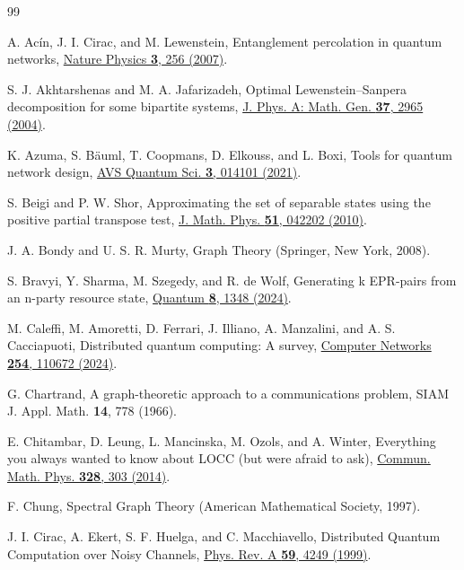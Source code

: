 \documentclass[a4paper,onecolumn,accepted=2024-12-14]{quantumarticle}
\theoremstyle{plain}
\begin{document}
\begin{thebibliography}{99}




 A. Ac\'in, J. I. Cirac, and M. Lewenstein, Entanglement percolation in quantum networks, \href{https://doi.org/10.1038/nphys549}{Nature Physics \textbf{3}, 256 (2007)}.

 S. J. Akhtarshenas and M. A. Jafarizadeh, Optimal Lewenstein–Sanpera decomposition for some bipartite
  systems, \href{https://doi.org/10.1088/0305-4470/37/8/008}{J. Phys. A: Math. Gen. \textbf{37}, 2965 (2004)}.
  
 K. Azuma, S. B{\"a}uml, T. Coopmans, D. Elkouss, and L. Boxi, Tools for quantum network design, \href{https://doi.org/10.1116/5.0024062}{AVS Quantum Sci. \textbf{3}, 014101 (2021)}.

 S. Beigi and P. W. Shor, Approximating the set of separable states using the positive partial
  transpose test, \href{https://doi.org/10.1063/1.3364793}{J. Math. Phys. \textbf{51}, 042202 (2010)}.
  
 J. A. Bondy and U. S. R. Murty, Graph Theory (Springer, New York, 2008).

 S. Bravyi, Y. Sharma, M. Szegedy, and R. de Wolf, Generating k EPR-pairs from an n-party resource state, \href{https://doi.org/10.22331/q-2024-05-14-1348}{Quantum \textbf{8}, 1348 (2024)}.

 M. Caleffi, M. Amoretti, D. Ferrari, J. Illiano, A. Manzalini, and A. S. Cacciapuoti, Distributed quantum computing: A survey, \href{https://doi.org/10.1016/j.comnet.2024.110672}{Computer Networks \textbf{254}, 110672 (2024)}.
    
 G. Chartrand, A graph-theoretic approach to a communications problem, SIAM J. Appl. Math. \textbf{14}, 778 (1966).

 E. Chitambar, D. Leung, L. Mancinska, M. Ozols, and A. Winter, Everything you always wanted to know about LOCC (but were afraid to
  ask), \href{https://doi.org/10.1007/s00220-014-1953-9}{Commun. Math. Phys. \textbf{328}, 303 (2014)}.
  
 F. Chung, Spectral Graph Theory (American Mathematical Society, 1997).

 J. I. Cirac, A. Ekert, S. F. Huelga, and C. Macchiavello, Distributed Quantum Computation over Noisy Channels, \href{https://doi.org/10.1103/PhysRevA.59.4249}{Phys. Rev. A \textbf{59}, 4249 (1999)}.
    

\end{thebibliography}
\end{document}
